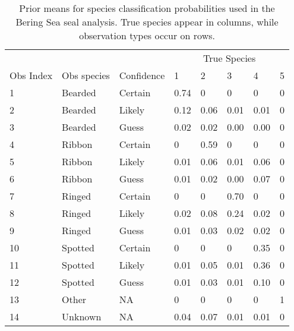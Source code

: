 \documentclass[12pt,fleqn]{article}
\begin{document}
\begin{flushleft}
\begin{table}
\caption{Prior means for species classification probabilities used in the Bering Sea seal analysis.  True species appear in columns, while observation types occur on rows.}
\begin{tabular}{llllllll}
\hline
& & & \multicolumn{5}{c}{True Species} \\ \cline{4-8}
Obs Index & Obs species & Confidence & 1 & 2 & 3 & 4 & 5 \\
1 & Bearded & Certain & 0.74  & 0 & 0 & 0 & 0 \\
2 & Bearded & Likely &  0.12 & 0.06 & 0.01 & 0.01 & 0 \\
3 & Bearded & Guess &  0.02 & 0.02 & 0.00 & 0.00 & 0 \\
4 & Ribbon & Certain & 0 & 0.59 & 0 & 0 & 0 \\
5 & Ribbon & Likely & 0.01 & 0.06 & 0.01 & 0.06 & 0 \\
6 & Ribbon & Guess & 0.01 & 0.02 & 0.00 & 0.07 & 0 \\
7 & Ringed & Certain & 0 & 0 & 0.70 & 0 & 0 \\
8 & Ringed & Likely & 0.02 & 0.08 & 0.24 & 0.02 & 0 \\
9 & Ringed & Guess & 0.01 & 0.03 & 0.02 & 0.02 & 0 \\
10 & Spotted & Certain & 0 & 0 & 0 & 0.35 & 0 \\
11 & Spotted & Likely & 0.01 & 0.05 & 0.01 & 0.36 & 0 \\
12 & Spotted & Guess & 0.01 & 0.03 & 0.01 & 0.10 & 0 \\
13 & Other & NA & 0 & 0 & 0 & 0 & 1 \\
14 & Unknown & NA & 0.04 & 0.07 & 0.01 & 0.01 & 0 \\
\hline
\end{tabular}
\label{tab:confuse_seal}
\end{table}


%

%

\end{flushleft}
\end{document}
